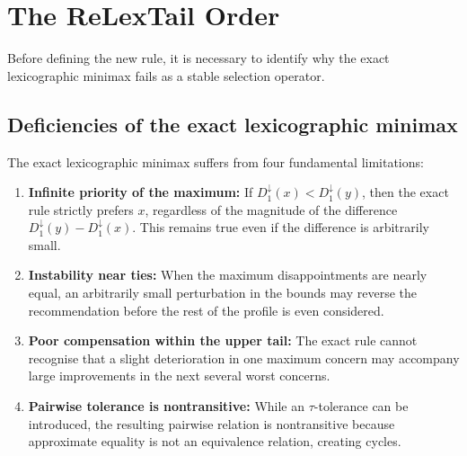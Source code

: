 \section{The ReLexTail Order}
\label{sec:relextail}

Before defining the new rule, it is necessary to identify why the exact lexicographic minimax fails as a stable selection operator.

\subsection{Deficiencies of the exact lexicographic minimax}
The exact lexicographic minimax suffers from four fundamental limitations:
\begin{enumerate}
    \item \textbf{Infinite priority of the maximum:} If $D^\downarrow_1(x) < D^\downarrow_1(y)$, then the exact rule strictly prefers $x$, regardless of the magnitude of the difference $D^\downarrow_1(y)-D^\downarrow_1(x)$. This remains true even if the difference is arbitrarily small.
    \item \textbf{Instability near ties:} When the maximum disappointments are nearly equal, an arbitrarily small perturbation in the bounds may reverse the recommendation before the rest of the profile is even considered.
    \item \textbf{Poor compensation within the upper tail:} The exact rule cannot recognise that a slight deterioration in one maximum concern may accompany large improvements in the next several worst concerns.
    \item \textbf{Pairwise tolerance is nontransitive:} While an $\tau$-tolerance can be introduced, the resulting pairwise relation is nontransitive because approximate equality is not an equivalence relation, creating cycles.
\end{enumerate}

